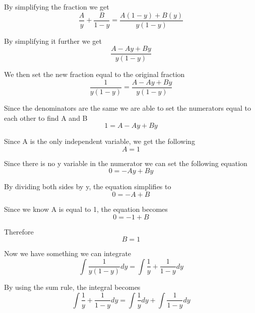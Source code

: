 \documentclass[12pt]{article}
\begin{document}
By simplifying the fraction we get
\begin{equation*}
\frac{A}{y} + \frac{B}{1-y} = \frac{A(1-y) + B(y)}{y(1-y)}
\end{equation*}

By simplifying it further we get
\begin{equation*}
\frac{A-Ay + By}{y(1-y)}
\end{equation*}

We then set the new fraction equal to the original fraction
\begin{equation*}
\frac{1}{y(1-y)} = \frac{A-Ay + By}{y(1-y)}
\end{equation*}

Since the denominators are the same we are able to set the numerators equal to each other to find A and B
\begin{equation*}
1 = A - Ay + By
\end{equation*}

Since A is the only independent variable, we get the following
\begin{equation*}
A = 1 
\end{equation*}

Since there is no y variable in the numerator we can set the following equation
\begin{equation*}
0 = - Ay + By
\end{equation*}

By dividing both sides by y, the equation simplifies to 
\begin{equation*}
0 = - A + B
\end{equation*}

Since we know A is equal to 1, the equation becomes
\begin{equation*}
0 = -1 + B
\end{equation*}

Therefore
\begin{equation*}
B = 1
\end{equation*}

Now we have something we can integrate
\begin{equation*}
\int \frac{1}{y(1-y)}dy = \int \frac{1}{y} + \frac{1}{1-y}dy
\end{equation*}

By using the sum rule, the integral becomes
\begin{equation*}
\int \frac{1}{y} + \frac{1}{1-y}dy = \int \frac{1}{y}dy + \int \frac{1}{1-y}dy
\end{equation*}
\end{document}

